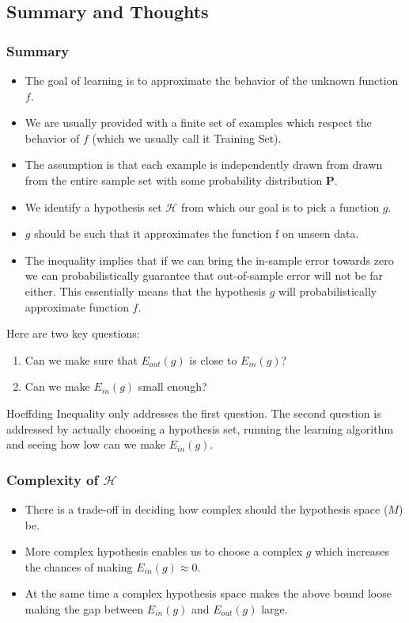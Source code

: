 \documentclass{article}
\begin{document}
\subsection{Summary and Thoughts}
\subsubsection{Summary}
\begin{itemize}
    \item The goal of learning is to approximate the behavior of the unknown function $f$.
    \item We are usually provided with a finite set of examples which respect the behavior of $f$ (which we usually call it Training Set).
    \item The assumption is that each example is independently drawn from drawn from the entire sample set with some probability distribution $\mathbf{P}$.
    \item We identify a hypothesis set $\mathcal{H}$ from which our goal is to pick a function $g$.
    \item $g$ should be such that it approximates the function f on unseen data.
    \item The inequality implies that if we can bring the in-sample error towards zero we can probabilistically guarantee that out-of-sample error will not be far either. This essentially means that the hypothesis $g$ will probabilistically approximate function $f$.
\end{itemize}
Here are two key questions:
\begin{enumerate}
    \item Can we make sure that $E_{out}(g)$ is close to $E_{in}(g)$?
    \item Can we make $E_{in}(g)$ small enough?
\end{enumerate}
Hoeffding Inequality only addresses the first question. The second question is addressed by actually choosing a hypothesis set, running the learning algorithm and seeing how low can we make $E_{in}(g)$.

\subsubsection{Complexity of $\mathcal{H}$}
\begin{itemize}
    \item There is a trade-off in deciding how complex should the hypothesis space ($M$) be.
    \item More complex hypothesis enables us to choose a complex $g$ which increases the chances of making $E_{in}(g) \approx 0$.
    \item At the same time a complex hypothesis space makes the above bound loose making the gap between $E_{in}(g)$ and $E_{out}(g)$ large.
\end{itemize}
\end{document}
